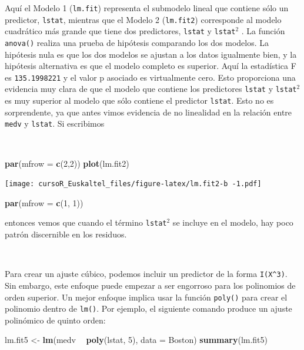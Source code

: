 \documentclass[]{book}
\newenvironment{Shaded}{\begin{snugshade}}{\end{snugshade}}
\newcommand{\KeywordTok}[1]{\textcolor[rgb]{0.13,0.29,0.53}{\textbf{#1}}}
\newcommand{\DataTypeTok}[1]{\textcolor[rgb]{0.13,0.29,0.53}{#1}}
\newcommand{\DecValTok}[1]{\textcolor[rgb]{0.00,0.00,0.81}{#1}}
\newcommand{\StringTok}[1]{\textcolor[rgb]{0.31,0.60,0.02}{#1}}
\newcommand{\OperatorTok}[1]{\textcolor[rgb]{0.81,0.36,0.00}{\textbf{#1}}}
\newcommand{\NormalTok}[1]{#1}
\begin{document}
Aquí el Modelo 1 (\texttt{lm.fit}) representa el submodelo lineal que
contiene sólo un predictor, \texttt{lstat}, mientras que el Modelo 2
(\texttt{lm.fit2}) corresponde al modelo cuadrático más grande que tiene
dos predictores, \texttt{lstat} y \texttt{lstat}\(^2\) . La función
\texttt{anova()} realiza una prueba de hipótesis comparando los dos
modelos. La hipótesis nula es que los dos modelos se ajustan a los datos
igualmente bien, y la hipótesis alternativa es que el modelo completo es
superior. Aquí la estadística F es \texttt{135.1998221} y el valor p
asociado es virtualmente cero. Esto proporciona una evidencia muy clara
de que el modelo que contiene los predictores \texttt{lstat} y
\texttt{lstat}\(^2\) es muy superior al modelo que sólo contiene el
predictor \texttt{lstat}. Esto no es sorprendente, ya que antes vimos
evidencia de no linealidad en la relación entre \texttt{medv} y
\texttt{lstat}. Si escribimos

~

\begin{Shaded}
\begin{Highlighting}[]
\KeywordTok{par}\NormalTok{(}\DataTypeTok{mfrow =} \KeywordTok{c}\NormalTok{(}\DecValTok{2}\NormalTok{,}\DecValTok{2}\NormalTok{))}
\KeywordTok{plot}\NormalTok{(lm.fit2)}
\end{Highlighting}
\end{Shaded}

\texttt{[image: cursoR\_Euskaltel\_files/figure-latex/lm.fit2-b -1.pdf]}

\begin{Shaded}
\begin{Highlighting}[]
\KeywordTok{par}\NormalTok{(}\DataTypeTok{mfrow =} \KeywordTok{c}\NormalTok{(}\DecValTok{1}\NormalTok{, }\DecValTok{1}\NormalTok{))}
\end{Highlighting}
\end{Shaded}

entonces vemos que cuando el término \texttt{lstat}\(^2\) se incluye en
el modelo, hay poco patrón discernible en los residuos.

~

Para crear un ajuste cúbico, podemos incluir un predictor de la forma
\texttt{I(X\^{}3)}. Sin embargo, este enfoque puede empezar a ser
engorroso para los polinomios de orden superior. Un mejor enfoque
implica usar la función \texttt{poly()} para crear el polinomio dentro
de \texttt{lm()}. Por ejemplo, el siguiente comando produce un ajuste
polinómico de quinto orden:

\begin{Shaded}
\begin{Highlighting}[]
\NormalTok{lm.fit5 <-}\StringTok{ }\KeywordTok{lm}\NormalTok{(medv }\OperatorTok{~}\StringTok{ }\KeywordTok{poly}\NormalTok{(lstat, }\DecValTok{5}\NormalTok{), }\DataTypeTok{data =}\NormalTok{ Boston)}
\KeywordTok{summary}\NormalTok{(lm.fit5)}
\end{Highlighting}
\end{Shaded}
\end{document}
